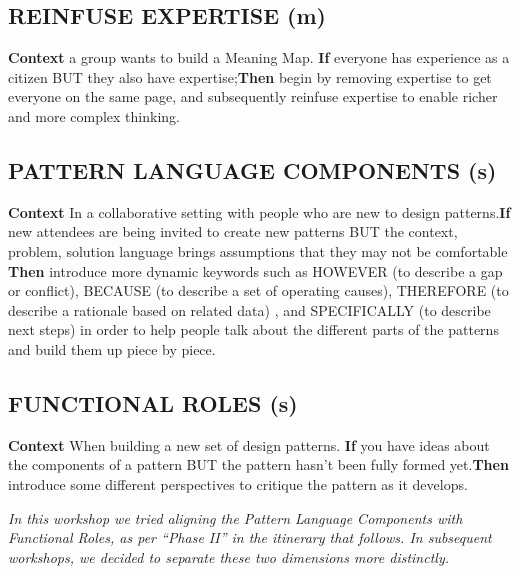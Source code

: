 \documentclass[acmlarge,timestamp]{acmart}
\newcommand{\sensory}{(s)}
\newcommand{\motor}{(m)}
\begin{document}
\subsection*{REINFUSE EXPERTISE {\hfill \motor}}

\textbf{Context} a group wants to build a {\sc Meaning Map}.\newline
\textbf{If} everyone has experience as a citizen BUT they also have
expertise;\newline \textbf{Then} begin by removing expertise to get
everyone on the same page, and subsequently reinfuse expertise to
enable richer and more complex thinking.\newline\smallskip

\subsection*{PATTERN LANGUAGE COMPONENTS {\hfill \sensory}}

\textbf{Context} In a collaborative setting with people who are new to
design patterns.\newline \textbf{If} new attendees are being invited
to create new patterns BUT the context, problem, solution language
brings assumptions that they may not be comfortable \newline \textbf{Then}
introduce more dynamic keywords such as HOWEVER (to describe a gap or
conflict), BECAUSE (to describe a set of operating causes), THEREFORE
(to describe a rationale based on related data) , and SPECIFICALLY (to
describe next steps) in order to help people talk about the different parts
of the patterns and build them up piece by piece.

\subsection*{FUNCTIONAL ROLES {\hfill \sensory}}

\textbf{Context} When building a new set of design patterns.\newline
\textbf{If} you have ideas about the components of a pattern BUT the
pattern hasn’t been fully formed yet.\newline \textbf{Then} introduce
some different perspectives to critique the pattern as it
develops.

\emph{In this workshop we tried aligning the {\sc Pattern Language
  Components} with {\sc Functional Roles}, as per “Phase II” in the
itinerary that follows.  In subsequent workshops, we decided to
separate these two dimensions more distinctly.}
\end{document}
